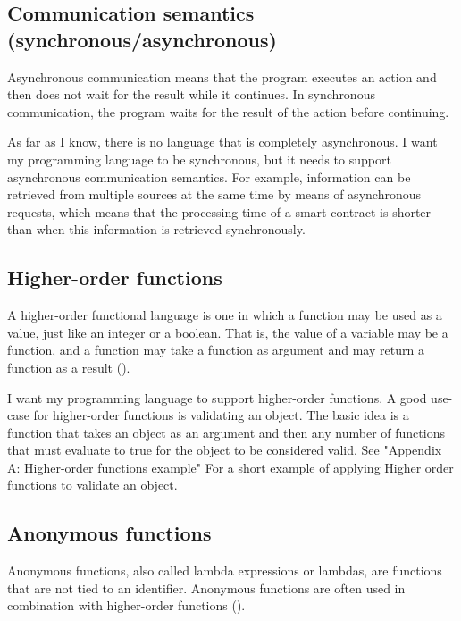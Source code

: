 \documentclass{uva-inf-article}
\begin{document}
\subsection{Communication semantics (synchronous/asynchronous)}
\par Asynchronous communication means that the program executes an action and then does not wait for the result while it continues. 
In synchronous communication, the program waits for the result of the action before continuing.
\vspace{5mm}

As far as I know, there is no language that is completely asynchronous. 
I want my programming language to be synchronous, but it needs to support asynchronous communication semantics.
For example, information can be retrieved from multiple sources at the same time by means of asynchronous requests, 
which means that the processing time of a smart contract is shorter than when this information is retrieved synchronously.

\newpage
\subsection{Higher-order functions}
\par A higher-order functional language is one in which a function may be used as a value, 
just like an integer or a boolean. That is, the value of a variable may be a function, 
and a function may take a function as argument and may return a function as a result
(\cite{Sestoft2012}).
\vspace{5mm}

\par I want my programming language to support higher-order functions.
A good use-case for higher-order functions is validating an object.
The basic idea is a function that takes an object as an argument and then any number of 
functions that must evaluate to true for the object to be considered valid.
See "Appendix A: Higher-order functions example" For a short example of applying 
Higher order functions to validate an object.

\subsection{Anonymous functions}
\par Anonymous functions, also called lambda expressions or lambdas, are functions that are not tied to an identifier.
Anonymous functions are often used in combination with higher-order functions (\cite{HigherOrder}).
\vspace{5mm}
\end{document}
